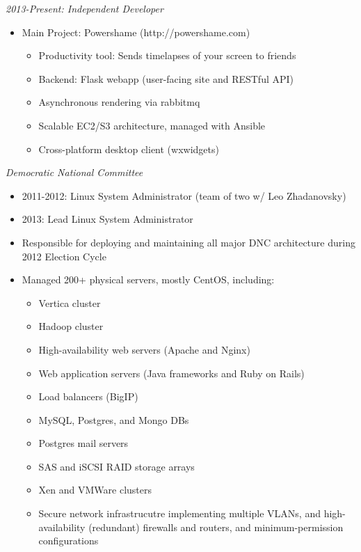 \documentclass[11pt]{res} %
\begin{document}
\begin{resume}
{\sl 2013-Present: Independent Developer }
    \begin{itemize} 
        \item Main Project: Powershame (http://powershame.com)
        \begin{itemize}
            \item Productivity tool: Sends timelapses of your screen to friends
            \item Backend: Flask webapp (user-facing site and RESTful API)
            \item Asynchronous rendering via rabbitmq
            \item Scalable EC2/S3 architecture, managed with Ansible
            \item Cross-platform desktop client (wxwidgets)
        \end{itemize}
    \end{itemize}
\sl{Democratic National Committee} 
        \begin{itemize}
            \item 2011-2012: Linux System Administrator (team of two w/ Leo Zhadanovsky)
            \item 2013: Lead Linux System Administrator
            \item Responsible for deploying and maintaining all major DNC architecture during 2012 Election Cycle
            \item Managed 200+ physical servers, mostly CentOS, including:
                \begin{itemize}
                    \item Vertica cluster
                    \item Hadoop cluster
                    \item High-availability web servers (Apache and Nginx)
                    \item Web application servers (Java frameworks and Ruby on Rails)
                    \item Load balancers (BigIP)
                    \item MySQL, Postgres, and Mongo DBs
                    \item Postgres mail servers
                    \item SAS and iSCSI RAID storage arrays
                    \item Xen and VMWare clusters
                    \item Secure network infrastrucutre implementing multiple VLANs, and high-availability (redundant) firewalls and routers, and minimum-permission configurations

\end{itemize}
\end{itemize}
\end{resume}
\end{document}
